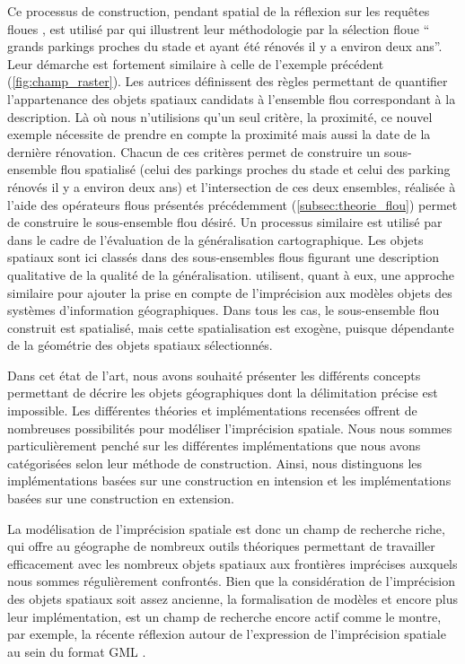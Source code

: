 Ce processus de construction, pendant spatial de la réflexion sur les
requêtes floues \textcite{Wang1994,Moreau2018}, est utilisé par
\textcite{Duraciova2017} qui illustrent leur méthodologie par la
sélection floue \enquote{ grands parkings proches du
  stade et ayant été rénovés il y a environ deux ans}. Leur démarche
est fortement similaire à celle de l’exemple précédent
(\autoref{fig:champ_raster}). Les autrices définissent des règles
permettant de quantifier l’appartenance des objets spatiaux candidats
à l’ensemble flou correspondant à la description. Là où nous
n’utilisions qu’un seul critère, la proximité, ce nouvel exemple
nécessite de prendre en compte la proximité mais aussi la date de la
dernière rénovation. Chacun de ces critères permet de construire un
sous-ensemble flou spatialisé (celui des parkings proches du stade et
celui des parking rénovés il y a environ deux ans) et l’intersection
de ces deux ensembles, réalisée à l’aide des opérateurs flous
présentés précédemment (\autoref{subsec:theorie_flou}) permet de
construire le sous-ensemble flou désiré. Un processus similaire est
utilisé par \textcite{Bard2003} dans le cadre de l’évaluation de la
généralisation cartographique. Les objets spatiaux sont ici classés
dans des sous-ensembles flous figurant une description qualitative de
la qualité de la généralisation. \textcite{Cross2000} utilisent, quant
à eux, une approche similaire pour ajouter la prise en compte de
l’imprécision aux modèles objets des systèmes d’information
géographiques. Dans tous les cas, le sous-ensemble flou construit est
spatialisé, mais cette spatialisation est exogène, puisque dépendante
de la géométrie des objets spatiaux sélectionnés.


Dans cet état de l’art, nous avons souhaité présenter les différents
concepts permettant de décrire les objets géographiques dont la
délimitation précise est impossible. Les différentes théories et
implémentations recensées offrent de nombreuses possibilités pour
modéliser l’imprécision spatiale. Nous nous sommes particulièrement
penché sur les différentes implémentations que nous avons catégorisées
selon leur méthode de construction. Ainsi, nous distinguons les
implémentations basées sur une construction en intension et les
implémentations basées sur une construction en extension.

La modélisation de l’imprécision spatiale est donc un champ de
recherche riche, qui offre au géographe de nombreux outils théoriques
permettant de travailler efficacement avec les nombreux objets
spatiaux aux frontières imprécises auxquels nous sommes régulièrement
confrontés. Bien que la considération de l’imprécision des objets
spatiaux soit assez ancienne, la formalisation de modèles et encore
plus leur implémentation, est un champ de recherche encore actif comme
le montre, par exemple, la récente réflexion autour de l’expression de
l’imprécision spatiale au sein du format GML \autocite{Wei2017}.


